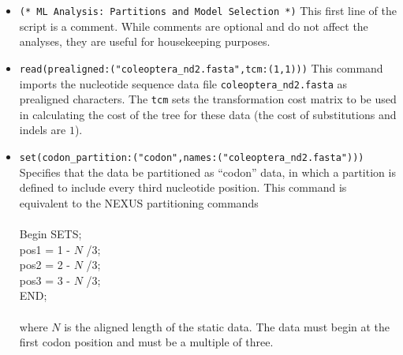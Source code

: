 \begin{itemize}
\item \texttt{(* ML Analysis: Partitions and Model Selection *)} 
This first line of the script is a comment. While comments are optional and do not affect the analyses, they are 
useful for housekeeping purposes.
\item \texttt{read(prealigned:("coleoptera\_nd2.fasta",tcm:(1,1)))} This command imports the nucleotide sequence 
data file \texttt{coleoptera\_nd2.fasta} as prealigned characters.  The \texttt{tcm} sets the transformation cost matrix 
to be used in calculating the cost of the tree for these data (the cost of substitutions and indels are $1$). 
\item \texttt{set(codon\_partition:("codon",names:("coleoptera\_nd2.fasta")))} Specifies that the data be 
partitioned as ``codon'' data, in which a partition is defined to include every third nucleotide position. 
This command is equivalent to the NEXUS partitioning commands
\\
\\
Begin SETS;\\
pos1 = 1 - $N$ /3;\\
pos2 = 2 - $N$ /3;\\
pos3 = 3 - $N$ /3;\\
END;\\
\\
where $N$ is the aligned length of the static data. The data must begin at the first codon position and must be a multiple
of three.



\end{itemize}
